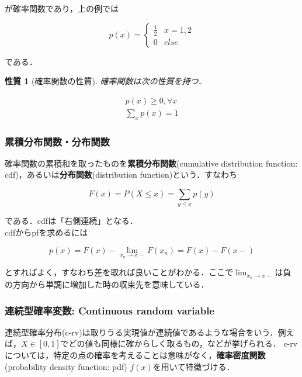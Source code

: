 \documentclass[12pt,a4j,draft]{jarticle}
\numberwithin{equation}{section}
\theoremstyle{break}
\newtheorem{property}{性質}[section]
\begin{document}
が確率関数であり，上の例では 

\begin{equation}
    p(x) = \begin{cases}
        \frac12 & x = 1,2 \\
        0 & else
    \end{cases}
\end{equation}

である．

\begin{property}[確率関数の性質]
確率関数は次の性質を持つ．

\begin{align}
    p(x) \geq 0, \forall x \\
    \sum_{x} p(x) = 1
    \label{eq:pf-property-1}
\end{align}

\end{property}

\subsubsection{累積分布関数・分布関数}

確率関数の累積和を取ったものを\textbf{累積分布関数}(cumulative distribution function: cdf)，あるいは\textbf{分布関数}(distribution function)という．すなわち

\begin{equation}
    F(x) = P(X \leq x) = \sum_{y \leq x}p(y)
\end{equation}

である．cdfは「右側連続」となる． \\

cdfからpfを求めるには

\begin{equation}
    p(x) = F(x) - \lim_{x_n \rightarrow x-} F(x_n) = F(x) - F(x-)
\end{equation}

とすればよく，すなわち差を取れば良いことがわかる．ここで$\lim_{x_n \rightarrow x-}$は負の方向から単調に増加した時の収束先を意味している．

\subsubsection{連続型確率変数: Continuous random variable}

連続型確率分布(c-rv)は取りうる実現値が連続値であるような場合をいう．例えば，$X \in [0,1]$でどの値も同様に確からしく取るもの，などが挙げられる． c-rvについては，特定の点の確率を考えることは意味がなく，\textbf{確率密度関数}(probability density function: pdf) $f(x)$を用いて特徴づける．
\end{document}
